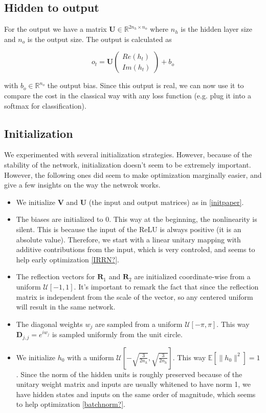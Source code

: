 \documentclass{article} %
\newcommand{\matr}[1]{\mathbf{#1}}
\newcommand\RR{\mathbb{R}}
\begin{document}
\subsection{Hidden to output}

For the output we have a matrix $\matr{U} \in \RR^{2n_h \times n_o}$ where $n_h$ is the hidden layer size and $n_o$ is the output size. The output is calculated as

$$ o_t = \matr{U} \begin{pmatrix} Re(h_t) \\ Im(h_t) \end{pmatrix} + b_o $$

with $b_o \in \RR^{n_o}$ the output bias. Since this output is real, we can now use it to compare the cost in the classical way with any loss function (e.g. plug it into a softmax for classification).
\subsection{Initialization}

We experimented with several initialization strategies. However, because of the stability of the network, initialization doesn't seem to be extremely important. However, the following ones did seem to make optimization marginally easier, and give a few insights on the way the netwrok works.

\begin{itemize}
  \item We initialize $\matr{V}$ and $\matr{U}$ (the input and output matrices) as in \ref{initpaper}.
  \item The biases are initialized to 0. This way at the beginning, the nonlinearity is silent. This is because the input of the ReLU is always positive (it is an absolute value). Therefore, we start with a linear unitary mapping with additive contributions from the input, which is very controled, and seems to help early optimization \ref{IRRN?}.
  \item The reflection vectors for $\matr{R}_1$ and $\matr{R}_2$ are initialized coordinate-wise from a uniform $\mathcal{U}[-1, 1]$. It's important to remark the fact that since the reflection matrix is independent from the scale of the vector, so any centered uniform will result in the same network.
  \item The diagonal weights $w_j$ are sampled from a uniform $\mathcal{U}[-\pi, \pi]$. This way $\matr{D}_{j,j} = e^{i w_j}$ is sampled uniformly from the unit circle.
  \item We initialize $h_0$ with a uniform $\mathcal{U}[-\sqrt{\frac{3}{2n_h}}, \sqrt{\frac{3}{2n_h}}]$. This way $\mathbb{E}\left[\|h_0\|^2\right] = 1$. Since the norm of the hidden units is roughly preserved because of the unitary weight matrix and inputs are usually whitened to have norm 1, we have hidden states and inputs on the same order of magnitude, which seems to help optimization \ref{batchnorm?}.
\end{itemize}

\
\end{document}
